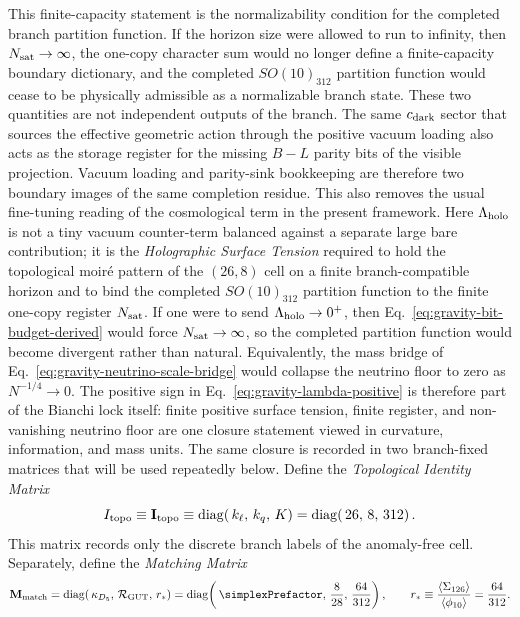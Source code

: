 \documentclass[11pt]{article}
\begin{document}
This finite-capacity statement is the normalizability condition for the
completed branch partition function. If the horizon size were allowed to run to
infinity, then $N_{\rm sat}\to\infty$, the one-copy character sum would no
longer define a finite-capacity boundary dictionary, and the completed
$SO(10)_{312}$ partition function would cease to be physically admissible as a
normalizable branch state.
These two quantities are not independent outputs of the branch. The same
$c_{\rm dark}$ sector that sources the effective geometric action through the
positive vacuum loading also acts as the storage register for the missing
$B-L$ parity bits of the visible projection. Vacuum loading and parity-sink
bookkeeping are therefore two boundary images of the same completion residue.
This also removes the usual fine-tuning reading of the cosmological term in the
present framework. Here $\Lambda_{\rm holo}$ is not a tiny vacuum counter-term
balanced against a separate large bare contribution; it is the
\emph{Holographic Surface Tension} required to hold the topological moir\'e
pattern of the $(26,8)$ cell on a finite branch-compatible horizon and to bind
the completed $SO(10)_{312}$ partition function to the finite one-copy
register $N_{\rm sat}$. If one were to send $\Lambda_{\rm holo}\to0^+$, then
Eq.~\eqref{eq:gravity-bit-budget-derived} would force $N_{\rm sat}\to\infty$,
so the completed partition function would become divergent rather than
natural. Equivalently, the mass bridge of
Eq.~\eqref{eq:gravity-neutrino-scale-bridge} would collapse the neutrino floor
to zero as $N^{-1/4}\to0$. The positive sign in
Eq.~\eqref{eq:gravity-lambda-positive} is therefore part of the Bianchi lock
itself: finite positive surface tension, finite register, and non-vanishing
neutrino floor are one closure statement viewed in curvature, information, and
mass units.
The same closure is recorded in two branch-fixed matrices that will be used
repeatedly below. Define the \emph{Topological Identity Matrix}
\begin{equation}
\label{eq:gravity-topological-identity-matrix}
 I_{\rm topo}
 \equiv
 \mathbf I_{\rm topo}
 \equiv
 \operatorname{diag}\!\left(
 \,k_{\ell},
 \,k_q,
 \,K
 \right)
 =
 \operatorname{diag}\!\left(
 \,26,
 \,8,
 \,312
 \right).
\end{equation}
This matrix records only the discrete branch labels of the anomaly-free cell.
Separately, define the \emph{Matching Matrix}
\begin{equation}
\label{eq:gravity-topological-identity-basis}
 \mathbf M_{\rm match}
 =
 \operatorname{diag}\!\left(
 \,\kappa_{D_5},
 \,\mathcal R_{\rm GUT},
 \,r_*
 \right)
 =
 \operatorname{diag}\!\left(
 \,\simplexPrefactor,
 \,\frac{8}{28},
 \,\frac{64}{312}
 \right),
 \qquad
 r_*\equiv\frac{\langle\Sigma_{126}\rangle}{\langle\phi_{10}\rangle}=\frac{64}{312}.
\end{equation}
\end{document}
